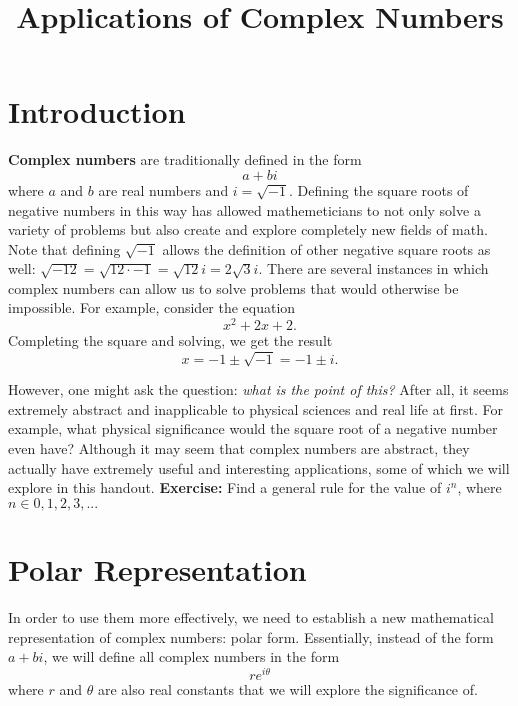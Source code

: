 \documentclass[12pt]{article}
\title{Applications of Complex Numbers}
\author{}
\date{}
\begin{document}
\maketitle

\tableofcontents

\section{Introduction}

\textbf{Complex numbers} are traditionally defined in the form \[ a + bi \] where $a$ and $b$ are real numbers and $i = \sqrt{-1}$. Defining the square roots of negative numbers in this way has allowed mathemeticians to not only solve a variety of problems but also create and explore completely new fields of math. Note that defining $\sqrt{-1}$ allows the definition of other negative square roots as well: $\sqrt{-12} = \sqrt{12 \cdot -1} = \sqrt{12}i = 2\sqrt{3}i$.
\newline\newline
There are several instances in which complex numbers can allow us to solve problems that would otherwise be impossible. For example, consider the equation \[ x^2 + 2x + 2. \] Completing the square and solving, we get the result \[ x = -1 \pm \sqrt{-1} = -1 \pm i. \] 


However, one might ask the question: \textit{what is the point of this?} After all, it seems extremely abstract and inapplicable to physical sciences and real life at first. For example, what physical significance would the square root of a negative number even have? Although it may seem that complex numbers are abstract, they actually have extremely useful and interesting applications, some of which we will explore in this handout. 
\newline\newline
\textbf{Exercise:} Find a general rule for the value of $i^n$, where $n \in {0, 1, 2, 3, ...}$

\section{Polar Representation}

In order to use them more effectively, we need to establish a new mathematical representation of complex numbers: polar form. Essentially, instead of the form $a + bi$, we will define all complex numbers in the form \[re^{i\theta}\] where $r$ and $\theta$ are also real constants that we will explore the significance of.
\end{document}
